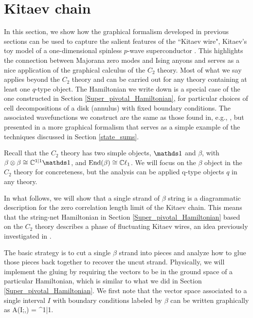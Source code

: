 
\section{Kitaev chain} \label{kitaev_wire}

In this section, we show how the graphical formalism developed in previous sections
can be used to capture the salient features of the ``Kitaev wire", 
Kitaev's toy model of a one-dimensional spinless $p$-wave superconductor \cite{kitaev2001}. 
This highlights the connection between Majorana zero modes and Ising anyons and serves 
as a nice application of the graphical calculus of the $C_2$ theory.
Most of what we say applies beyond the $C_2$ theory and can be carried out for any theory containing at least one $q$-type object.
The Hamiltonian we write down is a special case of
the one constructed in Section \ref{Super_pivotal_Hamiltonian}, for particular choices of cell decompositions of a disk (annulus) with fixed boundary conditions.
The associated wavefunctions we construct
are the same as those found in, e.g., \cite{fidkowski2011}, but presented in a more graphical formalism 
that serves as a simple example of the techniques discussed in Section \ref{state_sums}.

Recall that the $C_2$ theory has two simple objects, $\unit$ and $\beta$,
with $\beta\tp \beta\cong \cc^{1|1}\unit$,
and $\text{End}(\beta) \cong \mathbb{C}\ell_1$.
We will focus on the $\beta$ object in the $C_2$ 
theory for concreteness, but the analysis can be applied q-type objects $q$ in any theory.

In what follows, 
we will show that a single strand of $\beta$ string is a diagrammatic description for the zero correlation length limit of the Kitaev chain. 
This means that the string-net Hamiltonian in Section \ref{Super_pivotal_Hamiltonian} 
based on the $C_2$ theory describes a phase of fluctuating Kitaev wires, 
an idea previously investigated in \cite{tarantino2016,ware2016,kapustin2017}.

The basic strategy is to cut a single $\beta$ strand into pieces and analyze how to glue those pieces back together to recover the uncut strand. 
Physically, we will implement the gluing by requiring the vectors to be in the ground space of a particular Hamiltonian, which is similar to what we did in Section \ref{Super_pivotal_Hamiltonian}. 
We first note that the vector space associated to a single interval $I$ with boundary conditions labeled by $\beta$ can be written graphically as 
\be\label{VIbetabeta}
 A(I;\beta,\beta) = \cc \left[ \halfchain\;, \; \halfchaindot \right] \cong \cc^{1|1}.\ee
 
